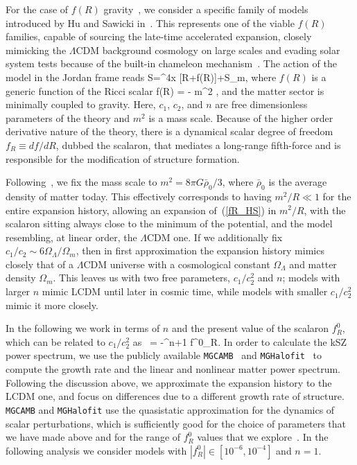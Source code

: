 For the case of $f(R)$ gravity~\citep{Song2007,Bean2007,Pogosian2008,DeFelice2010}, we  consider a specific family of  models introduced by Hu and Sawicki in~\cite{Hu2007}. This represents one of the viable $f(R)$ families, capable of sourcing the late-time  accelerated expansion, closely mimicking the $\Lambda$CDM background cosmology on large scales and evading solar system tests because of the built-in chameleon mechanism~\citep{Hu2007,Khoury2004}. The action of the model in the Jordan frame reads
\be
\label{fR_action}
S=\int \diff^4x [R+f(R)]+S_m,
\ee
where $f(R)$ is a generic function of the Ricci scalar
\be
\label{fR_HS}
f(R) = - m^2 ,
\ee
and the matter sector is minimally coupled to gravity. Here, $c_1$, $c_2$, and $n$ are free dimensionless parameters of the theory and $m^2$ is a mass scale. Because of the higher order derivative nature of the theory, there is a dynamical scalar degree of freedom $f_R \equiv df/dR$, dubbed the scalaron, that mediates a long-range fifth-force and is responsible for the modification of structure formation. 

Following~\cite{Hu2007}, we fix the mass scale to $m^2=8\pi G\bar{\rho}_0/3$, where $\bar{\rho}_0$ is the average density of matter today. This effectively corresponds to having $m^2/R\ll 1$ for the entire expansion history, allowing an expansion of~(\eqref{fR_HS}) in $m^2/R$, with the scalaron sitting always close to the minimum of the potential, and the model resembling, at linear order, the $\Lambda$CDM one.
If we additionally fix $c_1/c_2\sim6\Omega_\Lambda/\Omega_m$, then in first approximation  the expansion history mimics closely that of  a $\Lambda$CDM universe with a cosmological constant $\Omega_\Lambda$ and matter density $\Omega_m$. This leaves us with two free parameters, $c_1/c_2^2$ and $n$; models with larger $n$ mimic \gls{LCDM} until later in cosmic time, while models with smaller $c_1/c_2^2$ mimic it more closely.

In the following we work in terms of $n$ and the present value of the scalaron $f^0_R$, which can be related to $c_1/c_2^2$ as~\citep{Hu2007}
\be
{} = -^{n+1} f^0_R.
\ee
In order to calculate the kSZ power spectrum, we  use the publicly available \texttt{MGCAMB}~\citep{Hojjati2011} and \texttt{MGHalofit}~\citep{Zhao2014}   to compute the growth rate and the linear and nonlinear matter power spectrum. Following the discussion above, we approximate the expansion history to the \gls{LCDM} one, and focus on differences due to a different growth rate of structure.  \texttt{MGCAMB} and \texttt{MGHalofit} use the quasistatic approximation for the dynamics of scalar perturbations, which is sufficiently good for the choice of parameters that we have made above and for the range of $f^0_R$ values that we explore~\citep{Hojjati2012}. In the following analysis we consider models with $|f^0_R| \in [10^{-6}, 10^{-4}]$ and $n=1$.

